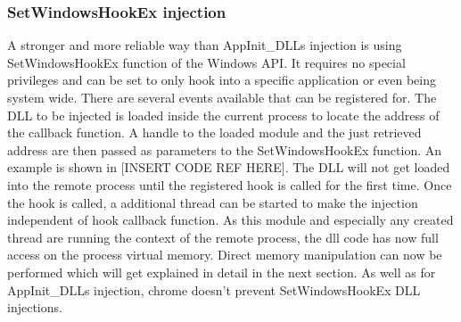 \subsubsection{SetWindowsHookEx injection}
A stronger and more reliable way than AppInit\_DLLs injection is using SetWindowsHookEx function of the Windows API. It requires no special privileges and can be set to only hook into a specific application or even being system wide. There are several events available that can be registered for. The DLL to be injected is loaded inside the current process to locate the address of the callback function. A handle to the loaded module and the just retrieved address are then passed as parameters to the SetWindowsHookEx function. An example is shown in [INSERT CODE REF HERE]. The DLL will not get loaded into the remote process until the registered hook is called for the first time. Once the hook is called, a additional thread can be started to make the injection independent of hook callback function. As this module and especially any created thread are running the context of the remote process, the dll code has now full access on the process virtual memory. Direct memory manipulation can now be performed which will get explained in detail in the next section. As well as for AppInit\_DLLs injection, chrome doesn't prevent SetWindowsHookEx DLL injections.